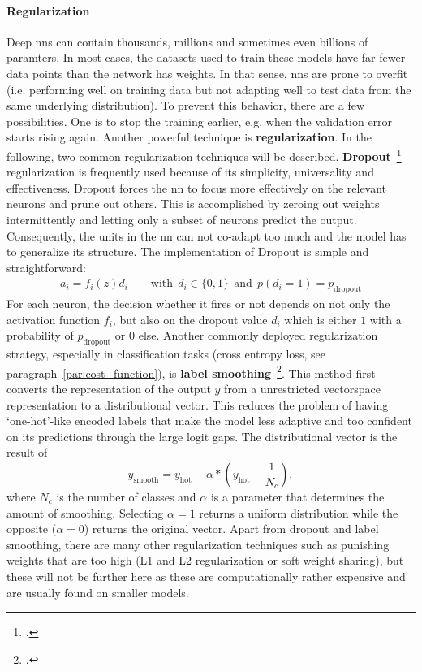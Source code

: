 \paragraph{Regularization}
Deep \gls{nn}s can contain thousands, millions and sometimes even billions of paramters. In most cases, the datasets used to train these models have far fewer data points than the network has weights. In that sense, \gls{nn}s are prone to overfit (i.e. performing well on training data but not adapting well to test data from the same underlying distribution). To prevent this behavior, there are a few possibilities. One is to stop the training earlier, e.g. when the validation error starts rising again. Another powerful technique is \textbf{regularization}. In the following, two common regularization techniques will be described. \textbf{Dropout}~\footcite{JMLR:v15:srivastava14a} regularization is frequently used because of its simplicity, universality and effectiveness. Dropout forces the \gls{nn} to focus more effectively on the relevant neurons and prune out others. This is accomplished by zeroing out weights intermittently and letting only a subset of neurons predict the output. Consequently, the units in the \gls{nn} can not co-adapt too much and the model has to generalize its structure. The implementation of Dropout is simple and straightforward:
\begin{align}
	a_i = f_i (z) d_i \qquad \text{with} \ \ d_i \in \{0, 1\} \ \ \text{and} \ \ p(d_i = 1) = p_{\text{dropout}}
\end{align}
For each neuron, the decision whether it fires or not depends on not only the activation function $ f_i $, but also on the dropout value $ d_i $ which is either $ 1 $ with a probability of $ p_{\text{dropout}} $ or $ 0 $ else. Another commonly deployed regularization strategy, especially in classification tasks (cross entropy loss, see paragraph~\ref{par:cost_function}), is \textbf{label smoothing}~\footcite{DBLP:journals/corr/abs-1906-02629}. This method first converts the representation of the output $ y $ from a unrestricted vectorspace representation to a distributional vector. This reduces the problem of having `one-hot'-like encoded labels that make the model less adaptive and too confident on its predictions through the large logit gaps. The distributional vector is the result of
\begin{equation}
	y_{\text{smooth}} = y_{\text{hot}} - \alpha * \left( y_{\text{hot}} - \frac{1}{N_c} \right),
\end{equation}
where $ N_c $ is the number of classes and $ \alpha $ is a parameter that determines the amount of smoothing. Selecting $ \alpha = 1 $ returns a uniform distribution while the opposite ($ \alpha = 0 $) returns the original vector. Apart from dropout and label smoothing, there are many other regularization techniques such as punishing weights that are too high (L1 and L2 regularization or soft weight sharing), but these will not be further here as these are computationally rather expensive and are usually found on smaller models.

